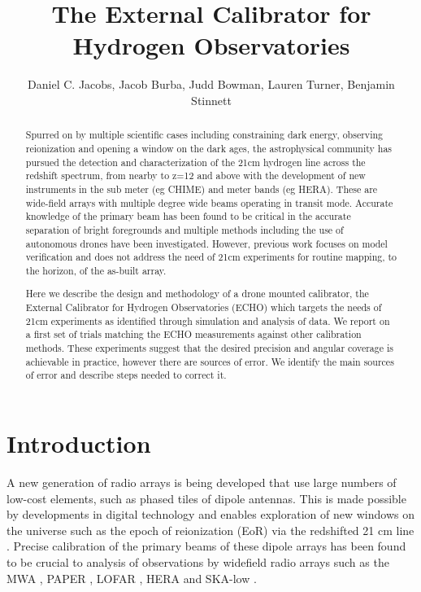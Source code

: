 \documentclass[preprint2,numberedappendix,tighten,twocolappendix]{aastex6}
\begin{document}
\title{The External Calibrator for Hydrogen Observatories}



\author{
Daniel C. Jacobs,
Jacob Burba,
Judd Bowman,
Lauren Turner,
Benjamin Stinnett
}



\begin{abstract}
Spurred on by multiple scientific cases including constraining dark energy, observing reionization and opening a window on the dark ages, the astrophysical community has pursued the detection and characterization of the 21cm hydrogen line across the redshift spectrum, from nearby to z=12 and above with the development of new instruments in the sub meter (eg CHIME) and meter bands (eg HERA).  These are wide-field arrays with multiple degree wide beams operating in transit mode.  Accurate knowledge of the primary beam has been found to be critical in the accurate separation of bright foregrounds and multiple methods including the use of autonomous drones have been investigated.  However, previous work focuses on model verification and does not address the need of 21cm experiments for routine mapping, to the horizon, of the as-built array.

Here we describe the design and methodology of a drone mounted calibrator, the External Calibrator for Hydrogen Observatories (ECHO) which targets the needs of 21cm experiments as identified through simulation and analysis of data. We report on a first set of trials matching the ECHO measurements against other calibration methods.  These experiments suggest that the desired precision and angular coverage is achievable in practice, however there are sources of error. We identify the main sources of error and describe steps needed to correct it.
\end{abstract}




\section{Introduction}\label{sec:intro}

A new generation of radio arrays is being developed that use large numbers of low-cost elements, such as phased tiles of dipole antennas. This is made possible by developments in digital technology and enables exploration of new windows on the universe such as the epoch of reionization (EoR) via the redshifted 21 cm line \citep{Morales:2010p8093,Furlanetto:2006p2267,Madau:1997p2232}. Precise calibration of the primary beams of these dipole arrays has been found to be crucial to analysis of observations by widefield radio arrays such as the MWA \citep{Tingay:2013p9022,Bowman:2013p9950}, PAPER \citep{Pober:2012p8800,2015ApJ...809...61A,2013ApJ...776..108J}, LOFAR \cite{Yatawatta:2013p9699}, HERA \citep{2016:deBoerHERAarxiv} and SKA-low \citep{Mellema:2013p10035,Mort:2016SKAlowimagingarxiv}.
\end{document}
